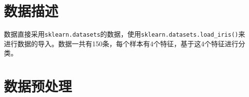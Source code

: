 \documentclass[utf-8]{article}
\begin{document}

\section{数据描述}

数据直接采用\verb|sklearn.datasets|的数据，使用\verb|sklearn.datasets.load_iris()|来进行数据的导入。数据一共有150条，每个样本有4个特征，基于这4个特征进行分类。









\section{数据预处理}
\end{document}
